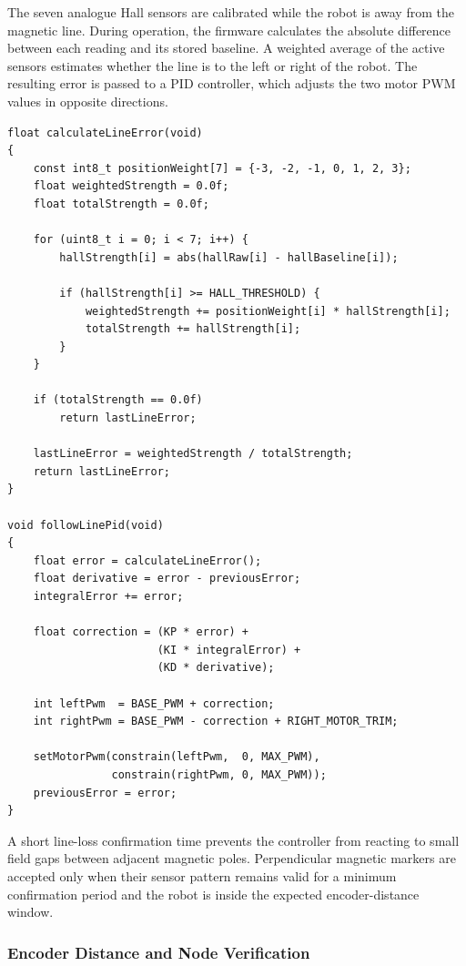\documentclass[12pt,a4paper]{article}
\begin{document}
The seven analogue Hall sensors are calibrated while the robot is away from
the magnetic line. During operation, the firmware calculates the absolute
difference between each reading and its stored baseline. A weighted average of
the active sensors estimates whether the line is to the left or right of the
robot. The resulting error is passed to a PID controller, which adjusts the two
motor PWM values in opposite directions.

\begin{lstlisting}[caption={Hall-array processing and differential PID control.},label={lst:hall-pid}]
float calculateLineError(void)
{
    const int8_t positionWeight[7] = {-3, -2, -1, 0, 1, 2, 3};
    float weightedStrength = 0.0f;
    float totalStrength = 0.0f;

    for (uint8_t i = 0; i < 7; i++) {
        hallStrength[i] = abs(hallRaw[i] - hallBaseline[i]);

        if (hallStrength[i] >= HALL_THRESHOLD) {
            weightedStrength += positionWeight[i] * hallStrength[i];
            totalStrength += hallStrength[i];
        }
    }

    if (totalStrength == 0.0f)
        return lastLineError;

    lastLineError = weightedStrength / totalStrength;
    return lastLineError;
}

void followLinePid(void)
{
    float error = calculateLineError();
    float derivative = error - previousError;
    integralError += error;

    float correction = (KP * error) +
                       (KI * integralError) +
                       (KD * derivative);

    int leftPwm  = BASE_PWM + correction;
    int rightPwm = BASE_PWM - correction + RIGHT_MOTOR_TRIM;

    setMotorPwm(constrain(leftPwm,  0, MAX_PWM),
                constrain(rightPwm, 0, MAX_PWM));
    previousError = error;
}
\end{lstlisting}

A short line-loss confirmation time prevents the controller from reacting to
small field gaps between adjacent magnetic poles. Perpendicular magnetic
markers are accepted only when their sensor pattern remains valid for a minimum
confirmation period and the robot is inside the expected encoder-distance
window.

\subsubsection{Encoder Distance and Node Verification}
\end{document}
